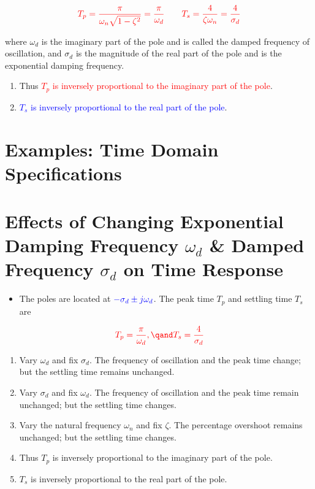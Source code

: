 \documentclass[
  14pt,
  a4paper,
  oneside,
  open=any,
  a4paper,
  14pt]{report}
\providecommand{\tightlist}{%
  \setlength{\itemsep}{0pt}\setlength{\parskip}{0pt}}\usepackage{longtable,booktabs,array}
\begin{document}
\[
    \textcolor{red}{T_p = \dfrac{\pi}{\omega_n \sqrt{1-\zeta^2}} = \dfrac{\pi}{\omega_d} \qquad T_s = \dfrac{4}{\zeta\omega_n} = \dfrac{4}{\sigma_d}}
\]

where \(\omega_d\) is the imaginary part of the pole and is called the
damped frequency of oscillation, and \(\sigma_d\) is the magnitude of
the real part of the pole and is the exponential damping frequency.

\begin{enumerate}
\def\labelenumi{\arabic{enumi}.}
\setcounter{enumi}{3}
\item
  Thus \textcolor{red}{\(T_p\) is inversely proportional to the
  imaginary part of the pole}.
\item
  \textcolor{blue}{\(T_s\) is inversely proportional to the real part of
  the pole}.
\end{enumerate}

\section{Examples: Time Domain
Specifications}\label{examples-time-domain-specifications}

\section{\texorpdfstring{Effects of Changing Exponential Damping
Frequency \(\omega_d\) \& Damped Frequency \(\sigma_d\) on Time
Response}{Effects of Changing Exponential Damping Frequency \textbackslash omega\_d \& Damped Frequency \textbackslash sigma\_d on Time Response}}\label{effects-of-changing-exponential-damping-frequency-omega_d-damped-frequency-sigma_d-on-time-response}

\begin{itemize}
\tightlist
\item
  The poles are located at
  \(\textcolor{blue}{-\sigma_d \pm j\omega_d}\). The peak time \(T_p\)
  and settling time \(T_s\) are
\end{itemize}

\[
    \textcolor{red}{T_p = \dfrac{\pi}{\omega_d}, \qand T_s = \dfrac{4}{\sigma_d}}
\]

\begin{enumerate}
\def\labelenumi{\arabic{enumi}.}
\item
  Vary \(\omega_d\) and fix \(\sigma_d\). The frequency of oscillation
  and the peak time change; but the settling time remains unchanged.
\item
  Vary \(\sigma_d\) and fix \(\omega_d\). The frequency of oscillation
  and the peak time remain unchanged; but the settling time changes.
\item
  Vary the natural frequency \(\omega_n\) and fix \(\zeta\). The
  percentage overshoot remains unchanged; but the settling time changes.
\item
  Thus \(T_p\) is inversely proportional to the imaginary part of the
  pole.
\item
  \(T_s\) is inversely proportional to the real part of the pole.
\end{enumerate}
\end{document}
